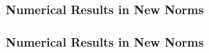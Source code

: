 \begin{frame}
    \frametitle{Numerical Results in New Norms}

    \vspace*{\fill}
    \begin{multicols}{2}

        \begin{center}
            \begin{minipage}{0.4\textwidth}
                \begin{figure}[!ht]
                    
                \end{figure}
            \end{minipage}
        \end{center}

        \vfill\null
        \columnbreak

        \begin{center}
            \begin{minipage}{0.4\textwidth}
                \begin{figure}[!ht]
                    
                \end{figure}
            \end{minipage}
        \end{center}

    \end{multicols}
    \vspace*{\fill}
    
\end{frame}

\begin{frame}
    \frametitle{Numerical Results in New Norms}

    \vspace*{\fill}
    \begin{multicols}{2}

        \begin{center}
            \begin{minipage}{0.4\textwidth}
                \begin{figure}[!ht]
                    
                \end{figure}
            \end{minipage}
        \end{center}

        \vfill\null
        \columnbreak

        \begin{center}
            \begin{minipage}{0.4\textwidth}
                \begin{figure}[!ht]
                    
                \end{figure}
            \end{minipage}
        \end{center}

    \end{multicols}
    \vspace*{\fill}
    
\end{frame}